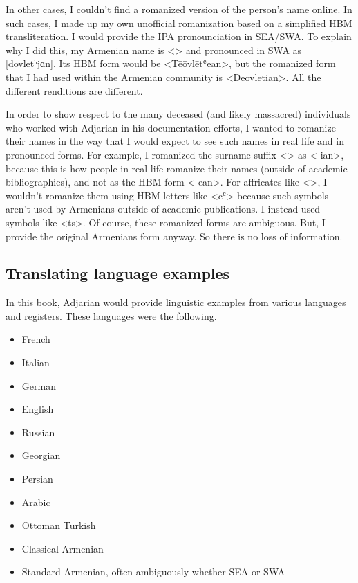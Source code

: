 In other cases, I couldn't find a romanized version of the  person's name online. In such cases, I made up my own unofficial romanization based on a simplified HBM transliteration. I would provide  the IPA pronounciation in SEA/SWA.  To explain why I did this, my Armenian name is <> and pronounced in SWA as [dovletʰjɑn]. Its HBM form would be <Tēōvlētʿean>, but the romanized form that I had used within the Armenian community is <Deovletian>.  All the different renditions are different.

In order  to show respect to the many deceased (and likely massacred) individuals who worked with Adjarian in his documentation efforts, I wanted to romanize their names in the way that I would expect to see such names in real life and in pronounced forms.  For example, I romanized the surname suffix <> as <-ian>, because this is how people in real life romanize their names (outside of academic bibliographies), and not as the HBM form <-ean>. For affricates like <>, I wouldn't romanize them using HBM letters like <cʿ> because such symbols aren't used by Armenians outside of academic publications. I instead used symbols like <ts>. Of course, these romanized forms are ambiguous. But, I provide the original Armenians form anyway. So there is no loss of information.






\subsection{Translating language examples}\label{sec:HossepIntro:translation:lang}

In this book, Adjarian would provide linguistic examples from various languages and registers. These languages were the following.

\begin{itemize}
		 \item French
\item Italian
\item German
\item English
		 \item Russian
		 \item Georgian
		 \item Persian
\item Arabic
		 \item Ottoman Turkish
		 \item Classical Armenian
		 \item Standard Armenian, often ambiguously whether SEA or SWA
		\end{itemize}
		

